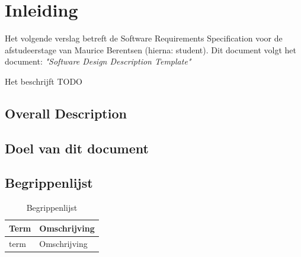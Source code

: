 \documentclass[a4paper, 11pt, oneside]{report}
\begin{document}

\tableofcontents
\clearpage





\chapter{Inleiding}
\label{inleiding}
Het volgende verslag betreft de Software Requirements Specification voor de afstudeerstage van Maurice Berentsen (hierna: student).
Dit document volgt het document: \textit{"Software Design Description Template"} \cite{template:sdd}

Het beschrijft TODO

\section{Overall Description}
\label{inleiding:omschrijving}
\section{Doel van dit document}
\label{inleiding:doel}
\section{Begrippenlijst}
\label{inleiding:begrippenlijst}

\begin{table}[H]
\centering

\label{begrippen}
\begin{tabular}{|l|l|}
\hline
\rowcolor[HTML]{C0C0C0}
Term        & Omschrijving                                                         \\ \hline
term        & Omschrijving                                                      	\\ \hline

\end{tabular}
\caption{Begrippenlijst}
\end{table}
\end{document}
